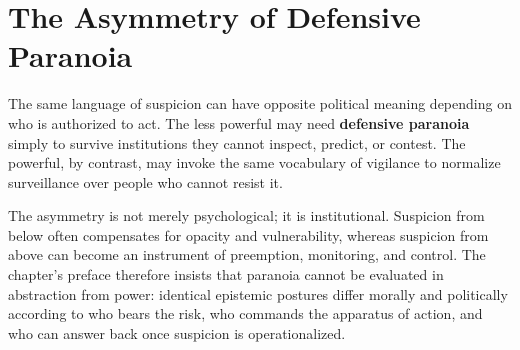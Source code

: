 
\chapter{The Asymmetry of Defensive Paranoia}
\label{ch:ch064}


The same language of suspicion can have opposite political meaning depending on who is authorized to act. The less powerful may need \textbf{defensive paranoia} simply to survive institutions they cannot inspect, predict, or contest. The powerful, by contrast, may invoke the same vocabulary of vigilance to normalize surveillance over people who cannot resist it.

The asymmetry is not merely psychological; it is institutional. Suspicion from below often compensates for opacity and vulnerability, whereas suspicion from above can become an instrument of preemption, monitoring, and control. The chapter's preface therefore insists that paranoia cannot be evaluated in abstraction from power: identical epistemic postures differ morally and politically according to who bears the risk, who commands the apparatus of action, and who can answer back once suspicion is operationalized.

